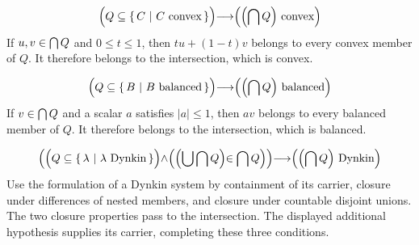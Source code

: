 \begin{theorem}
\begin{align*}
\left(
Q \subseteq \cc{C}{C\mathrm{\ convex}}
\middle)
\implies
\middle(
\middle(
\intersection Q
\middle)
\mathrm{\ convex}
\vphantom\union
\right)
\end{align*}
\Proof
If $u,v\in\bigcap Q$ and $0\leqslant t\leqslant1$, then
$tu+(1-t)v$ belongs to every convex member of $Q$. It therefore belongs
to the intersection, which is convex.
\DoneNoPar
\end{theorem}

\begin{theorem}
\begin{align*}
\left(
Q \subseteq \cc{B}{B\mathrm{\ balanced}}
\middle)
\implies
\middle(
\middle(
\intersection Q
\middle)
\mathrm{\ balanced}
\vphantom\union
\right)
\end{align*}
\Proof
If $v\in\bigcap Q$ and a scalar $a$ satisfies $|a|\leqslant1$,
then $av$ belongs to every balanced member of $Q$. It therefore belongs
to the intersection, which is balanced.
\DoneNoPar
\end{theorem}

\begin{theorem}
\begin{align*}
\left(
\middle(
Q \subseteq \cc{\lambda}{\lambda\mathrm{\ Dynkin}}
\middle)
\land
\middle(
\middle(
\union\intersection Q
\middle)
\in \intersection Q
\middle)
\middle)
\implies
\middle(
\middle(
\intersection Q
\middle)
\mathrm{\ Dynkin}
\vphantom\union
\right)
\end{align*}
\Proof
Use the formulation of a Dynkin system by containment of its carrier,
closure under differences of nested members, and closure under countable
disjoint unions. The two closure properties pass to the intersection.
The displayed additional hypothesis supplies its carrier, completing
these three conditions.
\DoneNoPar
\end{theorem}

